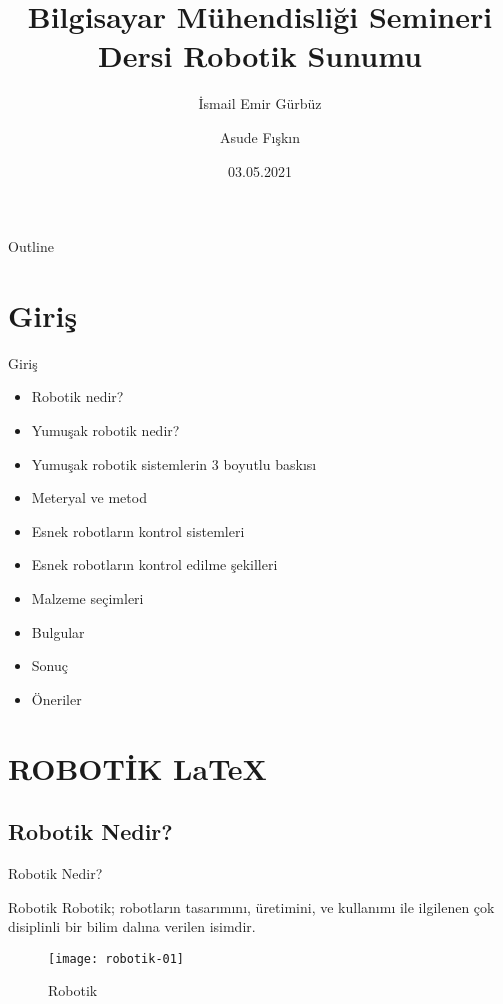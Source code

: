 \documentclass{beamer}
\title[Sunum]{Bilgisayar Mühendisliği Semineri Dersi Robotik Sunumu}
\author[İ. E. G. \& A. F.]{İsmail Emir Gürbüz \inst{1} \and Asude Fışkın \inst{2}}
\institute[Bilgisayar Müh.]{\inst{1} 20253072 \and \inst{2} 20253036}
\date{03.05.2021}
\begin{document}
\begin{frame}
  \titlepage
\end{frame}


\begin{frame}{Outline}
  \tableofcontents
\end{frame}

\section{Giriş}

\begin{frame}{Giriş}

\begin{itemize}
  \item Robotik nedir?
  \item Yumuşak robotik nedir? 
  \item Yumuşak robotik sistemlerin 3 boyutlu baskısı
  \item Meteryal ve metod
  \item Esnek robotların kontrol sistemleri
  \item Esnek robotların kontrol edilme şekilleri
  \item Malzeme seçimleri
  \item Bulgular
  \item Sonuç
  \item Öneriler
\end{itemize}
            
\vskip 1cm

\end{frame}

\section{ROBOTİK \LaTeX}

\subsection{Robotik Nedir?}

\begin{frame}{Robotik Nedir?}
\begin{block}{Robotik}
Robotik; robotların tasarımını, üretimini, ve kullanımı ile ilgilenen çok disiplinli bir bilim dalına verilen isimdir.
\end{block}


\begin{figure}
\texttt{[image: robotik-01]} 
\caption{\label{Şekil-1} Robotik} 
\end{figure}
\end{frame}
\end{document}
